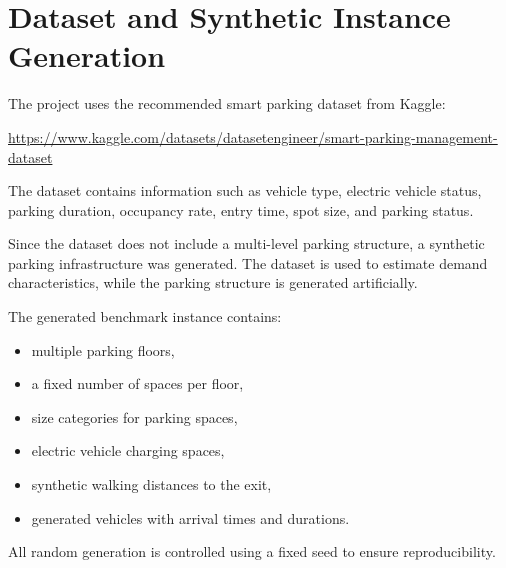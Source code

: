 \documentclass[12pt,a4paper]{article}
\begin{document}
\section{Dataset and Synthetic Instance Generation}

The project uses the recommended smart parking dataset from Kaggle:

\begin{center}
\url{https://www.kaggle.com/datasets/datasetengineer/smart-parking-management-dataset}
\end{center}

The dataset contains information such as vehicle type, electric vehicle status, parking duration, occupancy rate, entry time, spot size, and parking status.

Since the dataset does not include a multi-level parking structure, a synthetic parking infrastructure was generated. The dataset is used to estimate demand characteristics, while the parking structure is generated artificially.

The generated benchmark instance contains:

\begin{itemize}
    \item multiple parking floors,
    \item a fixed number of spaces per floor,
    \item size categories for parking spaces,
    \item electric vehicle charging spaces,
    \item synthetic walking distances to the exit,
    \item generated vehicles with arrival times and durations.
\end{itemize}

All random generation is controlled using a fixed seed to ensure reproducibility.
\end{document}
